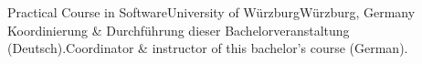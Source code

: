 \begin{cventries}
    {Practical Course in Software}{University of Würzburg}{Würzburg, Germany}%
    {} %
    {Koordinierung \& Durchführung dieser Bachelorveranstaltung (Deutsch).}{Coordinator \& instructor of this bachelor's course (German).}

\end{cventries}